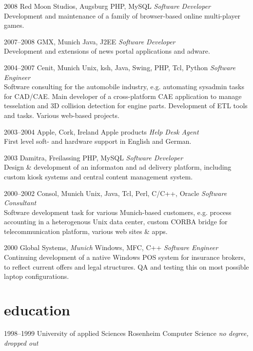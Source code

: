 \documentclass[]{friggeri-cv-a4}
\begin{document}
\begin{entrylist}
\entry
{2008}
{Red Moon Studios, Augsburg}
{PHP, MySQL}
{\emph{Software Developer} \\
Development and maintenance of a family of browser-based online multi-player games.}
\end{entrylist}


\begin{entrylist}
\entry
{2007--2008}
{GMX, Munich}
{Java, J2EE}
{\emph{Software Developer} \\
Development and extensions of news portal applications and adware.}
\end{entrylist}


\begin{entrylist}
\entry
{2004--2007}
{Cenit, Munich}
{Unix, ksh, Java, Swing, PHP, Tcl, Python}
{\emph{Software Engineer} \\
Software consulting for the automobile industry, e.g. automating sysadmin tasks for CAD/CAE. Main developer of a cross-platform CAE application to manage tesselation and 3D collision detection for engine parts. Development of ETL tools and tasks. Various web-based projects.}
\end{entrylist}


\begin{entrylist}
\entry
{2003--2004}
{Apple, Cork, Ireland}
{Apple products}
{\emph{Help Desk Agent} \\
First level soft- and hardware support in English and German.}
\end{entrylist}

\begin{entrylist}
\entry
{2003}
{Damitra, Freilassing}
{PHP, MySQL}
{\emph{Software Developer} \\
Design \& development of an informaton and ad delivery platform, including custom kiosk systems and central content management system.}
\end{entrylist}

\begin{entrylist}
\entry
{2000--2002}
{Consol, Munich}
{Unix, Java, Tcl, Perl, C/C++, Oracle}
{\emph{Software Consultant} \\
Software development task for various Munich-based customers, e.g. process accounting in a heterogenous Unix data center, custom CORBA bridge for telecommunication platform, various web sites \& apps.}
\end{entrylist}

\begin{entrylist}
\entry
{2000}
{Global Systems, \emph{Munich}}
{Windows, MFC, C++}
{\emph{Software Engineer} \\
Continuing development of a native Windows POS system for insurance brokers, to reflect current offers and legal structures. QA and testing this on most possible laptop configurations.}
\end{entrylist}

\section{education}
\begin{entrylist}
\entry
{1998--1999}
{University of applied Sciences Rosenheim}
{Computer Science}
{\textit{no degree, dropped out}}
\end{entrylist}
\end{document}
